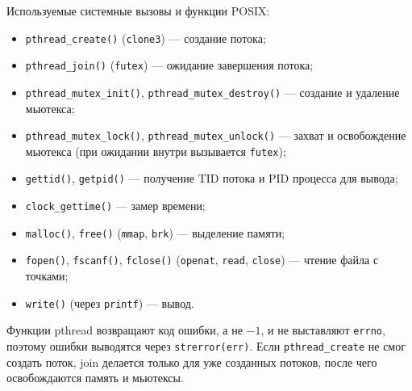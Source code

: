 Используемые системные вызовы и функции POSIX:
\begin{itemize}
\item \texttt{pthread\_create()} (\texttt{clone3}) --- создание потока;
\item \texttt{pthread\_join()} (\texttt{futex}) --- ожидание завершения потока;
\item \texttt{pthread\_mutex\_init()}, \texttt{pthread\_mutex\_destroy()} --- создание и удаление мьютекса;
\item \texttt{pthread\_mutex\_lock()}, \texttt{pthread\_mutex\_unlock()} --- захват и освобождение мьютекса (при ожидании внутри вызывается \texttt{futex});
\item \texttt{gettid()}, \texttt{getpid()} --- получение TID потока и PID процесса для вывода;
\item \texttt{clock\_gettime()} --- замер времени;
\item \texttt{malloc()}, \texttt{free()} (\texttt{mmap}, \texttt{brk}) --- выделение памяти;
\item \texttt{fopen()}, \texttt{fscanf()}, \texttt{fclose()} (\texttt{openat}, \texttt{read}, \texttt{close}) --- чтение файла с точками;
\item \texttt{write()} (через \texttt{printf}) --- вывод.
\end{itemize}

Функции pthread возвращают код ошибки, а не $-1$, и не выставляют \texttt{errno}, поэтому ошибки выводятся через \texttt{strerror(err)}. Если \texttt{pthread\_create} не смог создать поток, join делается только для уже созданных потоков, после чего освобождаются память и мьютексы.

